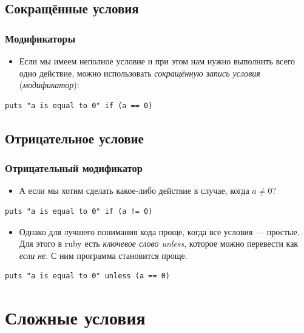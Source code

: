 \documentclass[compress,red]{beamer}
\begin{document}
\subsection{Сокращённые условия}
\begin{frame}[fragile]
  \frametitle{Модификаторы}
  \begin{itemize}
    \item Если мы имеем неполное условие и при этом нам нужно выполнить всего одно действие, можно использовать \emph{сокращённую запись условия} (\emph{модификатор}):
  \end{itemize}
  \begin{lstlisting}[label=ruby3,caption=Модификатор]
    puts "a is equal to 0" if (a == 0)
  \end{lstlisting}
\end{frame}

\subsection{Отрицательное условие}
\begin{frame}[fragile]
  \frametitle{Отрицательный модификатор}
  \begin{itemize}
    \item А если мы хотим сделать какое-либо действие в случае, когда $a \neq 0$?
  \end{itemize}
  \begin{lstlisting}[label=ruby4,caption=Простой вариант]
    puts "a is equal to 0" if (a != 0)
  \end{lstlisting}
  \begin{itemize}
    \item Однако для лучшего понимания кода проще, когда все условия --- простые. Для этого в ruby есть \emph{ключевое слово unless}, которое можно перевести как \emph{если не}. С ним программа становится проще.
  \end{itemize}
  \begin{lstlisting}[label=ruby5,caption=Улучшенный вариант]
    puts "a is equal to 0" unless (a == 0)
  \end{lstlisting}

\end{frame}

\section{Сложные условия}
\end{document}
